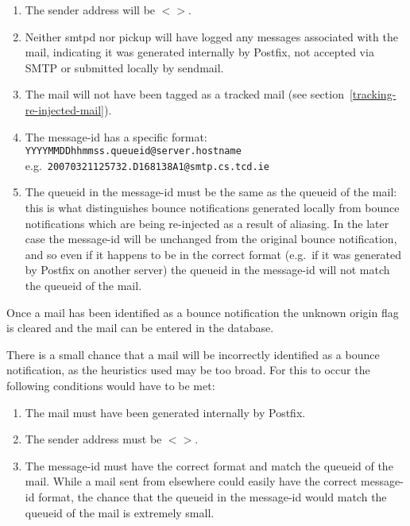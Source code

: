 \documentclass[a4paper,12pt,draft]{article}
\begin{document}
\begin{enumerate}

    \item The sender address will be $<>$.

    \item Neither smtpd nor pickup will have logged any messages associated
        with the mail, indicating it was generated internally by Postfix,
        not accepted via SMTP or submitted locally by sendmail.

    \item The mail will not have been tagged as a tracked mail (see
        section~\ref{tracking-re-injected-mail}).

    \item The message-id has a specific format: \newline
        \texttt{YYYYMMDDhhmmss.queueid@server.hostname} \newline
        e.g.\ \texttt{20070321125732.D168138A1@smtp.cs.tcd.ie}

    \item The queueid in the message-id must be the same as the queueid of
        the mail: this is what distinguishes bounce notifications generated
        locally from bounce notifications which are being re-injected as a
        result of aliasing.  In the later case the message-id will be
        unchanged from the original bounce notification, and so even if it
        happens to be in the correct format (e.g.\ if it was generated by
        Postfix on another server) the queueid in the message-id will not
        match the queueid of the mail.

\end{enumerate}

Once a mail has been identified as a bounce notification the unknown origin
flag is cleared and the mail can be entered in the database.

There is a small chance that a mail will be incorrectly identified as a
bounce notification, as the heuristics used may be too broad.  For this to
occur the following conditions would have to be met:

\begin{enumerate}

    \item The mail must have been generated internally by Postfix.

    \item The sender address must be $<>$.

    \item The message-id must have the correct format and match the queueid
        of the mail.  While a mail sent from elsewhere could easily have
        the correct message-id format, the chance that the queueid in the
        message-id would match the queueid of the mail is extremely small.

\end{enumerate}
\end{document}
